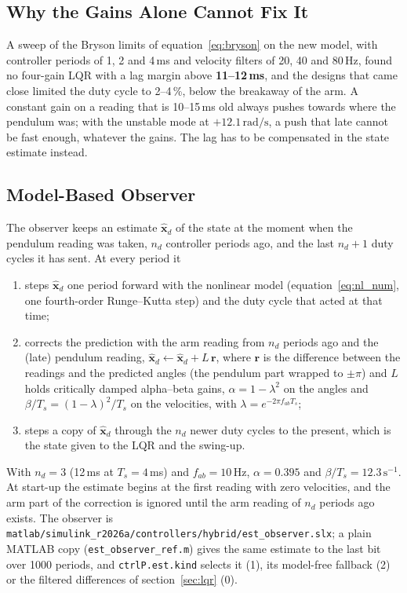 \documentclass[a4paper,11pt]{article}
\begin{document}
\subsection{Why the Gains Alone Cannot Fix It}
\label{sec:cu_gains}
A sweep of the Bryson limits of equation~\ref{eq:bryson} on the new model, with controller periods of 1, 2 and 4\,ms and velocity filters of 20, 40 and 80\,Hz, found no four-gain LQR with a lag margin above \textbf{11--12\,ms}, and the designs that came close limited the duty cycle to 2--4\,\%, below the breakaway of the arm. A constant gain on a reading that is 10--15\,ms old always pushes towards where the pendulum was; with the unstable mode at $+12.1\,\mathrm{rad/s}$, a push that late cannot be fast enough, whatever the gains. The lag has to be compensated in the state estimate instead.

\subsection{Model-Based Observer}
\label{sec:cu_observer}
The observer keeps an estimate $\hat{\mathbf{x}}_d$ of the state at the moment when the pendulum reading was taken, $n_d$ controller periods ago, and the last $n_d+1$ duty cycles it has sent. At every period it
\begin{enumerate}
  \item steps $\hat{\mathbf{x}}_d$ one period forward with the nonlinear model (equation~\ref{eq:nl_num}, one fourth-order Runge--Kutta step) and the duty cycle that acted at that time;
  \item corrects the prediction with the arm reading from $n_d$ periods ago and the (late) pendulum reading, $\hat{\mathbf{x}}_d \leftarrow \hat{\mathbf{x}}_d + L\,\mathbf{r}$, where $\mathbf{r}$ is the difference between the readings and the predicted angles (the pendulum part wrapped to $\pm\pi$) and $L$ holds critically damped alpha--beta gains, $\alpha = 1 - \lambda^2$ on the angles and $\beta/T_s = (1 - \lambda)^2/T_s$ on the velocities, with $\lambda = e^{-2\pi f_{ab} T_s}$;
  \item steps a copy of $\hat{\mathbf{x}}_d$ through the $n_d$ newer duty cycles to the present, which is the state given to the LQR and the swing-up.
\end{enumerate}
With $n_d = 3$ (12\,ms at $T_s = 4$\,ms) and $f_{ab} = 10$\,Hz, $\alpha = 0.395$ and $\beta/T_s = 12.3\,\mathrm{s^{-1}}$. At start-up the estimate begins at the first reading with zero velocities, and the arm part of the correction is ignored until the arm reading of $n_d$ periods ago exists. The observer is \nolinkurl{matlab/simulink_r2026a/controllers/hybrid/est_observer.slx}; a plain MATLAB copy (\texttt{est\_observer\_ref.m}) gives the same estimate to the last bit over 1000 periods, and \texttt{ctrlP.est.kind} selects it (1), its model-free fallback (2) or the filtered differences of section~\ref{sec:lqr} (0).
\end{document}
